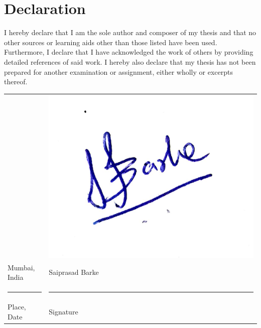 
\chapter*{Declaration}

I hereby declare that I am the sole author and composer of my thesis and that no other sources or learning aids other than those listed have been used. Furthermore, I declare that I have acknowledged the work of others by providing detailed references of said work.  \newline
I hereby also declare that my thesis has not been prepared for another examination or assignment, either wholly or excerpts thereof.
\\[3\normalbaselineskip]
\begin{tabular}{p{} l}

                                  &     \includegraphics[scale=0.1]{images/sign.jpg}\\
   Mumbai, India                  &        Saiprasad Barke\\
  \rule{\textwidth/3}{0.4pt}      &   \rule{\textwidth/3}{0.4pt} \\
  
  Place, Date                     &   Signature
\end{tabular}
